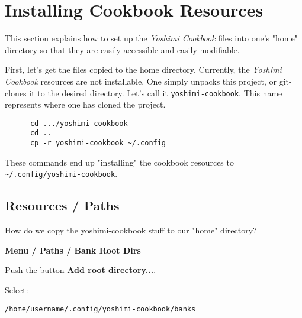 %
%
%

\section{Installing Cookbook Resources}
\label{sec:install}

   This section explains how to set up the \textsl{Yoshimi Cookbook} files into
   one's "home" directory so that they are easily accessible and easily
   modifiable.

   First, let's get the files copied to the home directory.  Currently, the
   \textsl{Yoshimi Cookbook} resources are not installable.  One simply unpacks
   this project, or git-clones it to the desired directory.  Let's call it
   \texttt{yoshimi-cookbook}.  This name represents where one has cloned the
   project.

   \begin{verbatim}
      cd .../yoshimi-cookbook
      cd ..
      cp -r yoshimi-cookbook ~/.config
   \end{verbatim}

   These commands end up "installing" the cookbook resources to
   \texttt{\textasciitilde/.config/yoshimi-cookbook}.

\subsection{Resources / Paths}
\label{subsec:resources_paths}

   How do we copy the yoshimi-cookbook stuff to our "home" directory?

   \textbf{Menu / Paths / Bank Root Dirs}

   Push the button \textbf{Add root directory...}.

   Select:

   \texttt{/home/username/.config/yoshimi-cookbook/banks}

